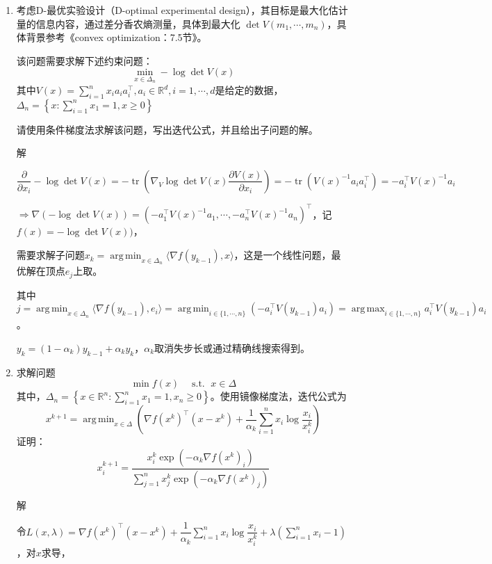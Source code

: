 \documentclass[cn,hazy,cyan,11pt,normal]{elegantnote}
\DeclareMathOperator*{\argmin}{arg\,min}
\DeclareMathOperator*{\argmax}{arg\,max}
\DeclareMathOperator*{\tr}{tr}
\DeclareMathOperator*{\st}{s.t.\,\,}
\begin{document}
\begin{enumerate}
\begin{itemize}
            \end{itemize}

        \item {\color{c1}考虑D-最优实验设计（D-optimal experimental design），其目标是最大化估计量的信息内容，通过差分香农熵测量，具体到最大化 $\det V(m_1,\cdots,m_n)$，具体背景参考《convex optimization：7.5节》。

            该问题需要求解下述约束问题：\[\min_{x\in\Delta_n} -\log\det V(x)\]其中$V(x)=\sum_{i=1}^n x_i a_i a_i^{\top},a_i\in \mathbb{R}^d,i=1,\cdots,d$是给定的数据，$\Delta_n=\left\{x:\sum_{i=1}^n x_1=1,x\geq0\right\}$

            请使用条件梯度法求解该问题，写出迭代公式，并且给出子问题的解。}

            \vspace{0.5cm}\textcolor{c2}解

            $\dfrac{\partial}{\partial x_i}-\log\det V(x)=-\tr\left(\nabla_{V}\log\det V(x)\dfrac{\partial V(x)} {\partial x_i}\right)=-\tr(V(x)^{-1}a_i a_i^{\top})=-a_i^{\top} V(x)^{-1}a_i$

            $\Rightarrow \nabla (-\log\det V(x))=\left(-a_1^{\top}V(x)^{-1}a_1,\cdots,-a_n^{\top}V(x)^{-1}a_n\right)^{\top}$，记$f(x)=-\log\det V(x))$，

            需要求解子问题$x_k=\argmin_{x\in \Delta_n}\langle \nabla f(y_{k-1}),x \rangle$，这是一个线性问题，最优解在顶点$e_j$上取。

            其中$j=\argmin_{x\in \Delta_n}\langle \nabla f(y_{k-1}),e_i \rangle=\argmin_{i\in\{1,\cdots,n\}}(-a_i^{\top}V(y_{k-1})a_i)=\argmax_{i\in\{1,\cdots,n\}}a_i^{\top}V(y_{k-1})a_i$。

            $y_k=(1-\alpha_k)y_{k-1}+\alpha_k y_k$，$\alpha_k$取消失步长或通过精确线搜索得到。\vspace{0.5cm}

        \item {\color{c1}求解问题\[\min f(x)\quad\st x\in\Delta\]其中，$\Delta_n=\left\{x\in\mathbb{R}^n :\sum_{i=1}^n x_1=1,x_n\geq0\right\}$。使用镜像梯度法，迭代公式为\[x^{k+1}=\argmin_{x\in\Delta}\left(\nabla f(x^k)^{\top}(x-x^k)+\dfrac1{\alpha_k}\sum\limits_{i=1}^n x_i\log\dfrac{x_i}{x^k_i}\right)\]证明：\[x^{k+1}_i=\dfrac {x_i^k\exp\left(-\alpha_k\nabla f(x^k)_i\right)}{\sum_{j=1}^n x^k_j \exp\left(-\alpha_k\nabla f(x^k)_j\right)}\]}

            \vspace{0.5cm}\textcolor{c2}解

            令$L(x,\lambda)=\nabla f(x^k)^{\top}(x-x^k)+\dfrac1{\alpha_k}\sum\limits_{i=1}^n x_i\log\dfrac{x_i}{x^k_i}+\lambda\left(\sum_{i=1}^n x_i-1\right)$，对$x$求导，


\end{enumerate}
\end{document}
